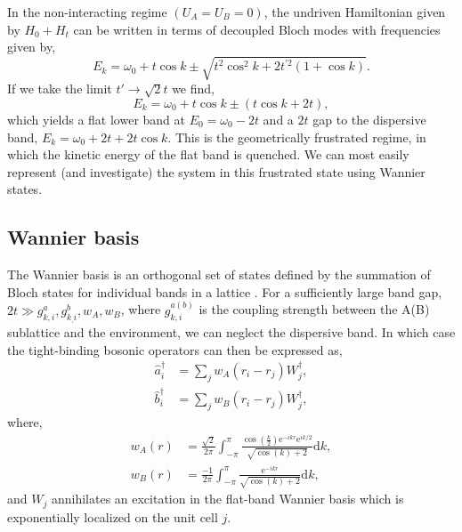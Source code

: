 In the non-interacting regime \((U_{A} = U_{B} = 0)\), the undriven Hamiltonian given by \(H_{0} + H_{t}\) can be written in terms of decoupled Bloch modes with frequencies given by,
\begin{equation}
	E_{k} = \omega_{0} + t \cos k \pm \sqrt{t^{2}\cos^{2}k + 2t^{'2}(1+\cos k)}.
	\label{eq:dim1-6}
\end{equation}
If we take the limit \(t' \rightarrow \sqrt{2}t\) we find,
\begin{equation}
	E_{k} = \omega_{0} + t \cos k \pm (t\cos k + 2t),
	\label{eq:dim1-7}
\end{equation}
which yields a flat lower band at \(E_{0} = \omega_{0} - 2t\) and a \(2t\) gap to the dispersive band, \(E_{k} = \omega_{0} + 2t + 2t\cos k\). This is the geometrically frustrated regime, in which the kinetic energy of the flat band is quenched. We can most easily represent (and investigate) the system in this frustrated state using Wannier states.

\subsection{Wannier basis}
The Wannier basis is an orthogonal set of states defined by the summation of Bloch states for individual bands in a lattice \cite{Wannier1937}. For a sufficiently large band gap, \(2t \gg g_{k,i}^{a},g_{k_,i}^{b},w_{A},w_{B}\), where \(g_{k,i}^{a(b)}\) is the coupling strength between the A(B) sublattice and the environment, we can neglect the dispersive band. In which case the tight-binding bosonic operators can then be expressed as,
\begin{align}
	\hat{a}_{i}^{\dagger} &= \sum_{j} w_{A}(r_{i} - r_{j}) W_{j}^{\dagger}, \label{eq:dim1-8} \\
	\hat{b}_{i}^{\dagger} &= \sum_{j} w_{B}(r_{i} - r_{j}) W_{j}^{\dagger}, \label{eq:dim1-9}
\end{align}
where,
\begin{align}
	w_{A}(r) &= \frac{\sqrt{2}}{2\pi} \int^{\pi}_{-\pi} \frac{\cos\left(\frac{k}{2}\right)\mathrm{e}^{-ikr}\mathrm{e}^{ik/2}}{\sqrt{\cos(k) + 2}} \mathrm{d}k, \label{eq:dim1-10} \\
	w_{B}(r) &= \frac{-1}{2\pi} \int^{\pi}_{-\pi} \frac{\mathrm{e}^{-ikr}}{\sqrt{\cos(k) + 2}} \mathrm{d}k, \label{eq:dim1-11}
\end{align}
and \(W_{j}\) annihilates an excitation in the flat-band Wannier basis which is exponentially localized on the unit cell \(j\).

